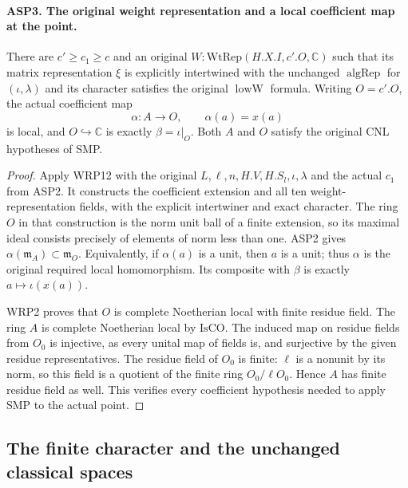 \documentclass[11pt,a4paper]{article}
\numberwithin{equation}{section}
\theoremstyle{remark}\newtheorem{remark}[theorem]{Remark}
\begin{document}
\paragraph{ASP3. The original weight representation and a local coefficient map at the point.}
\label{claim:ASP3}
There are $c'\geq c_1\geq c$ and an original
$W:\mathrm{WtRep}(H.X.I,\allowbreak{} c'.O,\mathbb C)$ such that
its matrix representation $\xi$ is explicitly
intertwined with the unchanged $\operatorname{algRep}$
for $(\iota,\lambda)$ and its character satisfies
the original $\operatorname{lowW}$ formula.
Writing $O=c'.O$, the actual coefficient map
\[
                \alpha:A\longrightarrow O,
                        \qquad\alpha(a)=x(a)
\]
is local, and $O\hookrightarrow\mathbb C$ is exactly
$\beta=\iota|_O$.  Both $A$ and $O$ satisfy
the original CNL hypotheses of SMP.
\begin{proof}
Apply WRP12 with the original
$L,\ell,\allowbreak{} n,\allowbreak{} H.V,\allowbreak{} H.S_l,\iota,\lambda$ and the actual
$c_1$ from ASP2.  It constructs the coefficient
extension and all ten weight-representation fields,
with the explicit intertwiner and exact character.
The ring $O$ in that construction is the norm unit
ball of a finite extension, so its maximal ideal
consists precisely of elements of norm less than
one.  ASP2 gives
$\alpha(\mathfrak m_A)\subset\mathfrak m_O$.
Equivalently, if $\alpha(a)$ is a unit, then $a$
is a unit; thus $\alpha$ is the original required
local homomorphism.  Its composite with $\beta$
is exactly $a\mapsto\iota(x(a))$.

WRP2 proves that $O$ is complete Noetherian local
with finite residue field.  The ring $A$ is complete
Noetherian local by $\mathrm{IsCO}$.  The induced
map on residue fields from $O_0$ is injective,
as every unital map of fields is, and surjective
by the given residue representatives.  The
residue field of $O_0$ is finite: $\ell$ is a
nonunit by its norm, so this field is a quotient
of the finite ring $O_0/\ell O_0$.
Hence $A$ has finite residue field as well.
This verifies every coefficient hypothesis
needed to apply SMP to the actual point.
\end{proof}

\subsection{The finite character and the unchanged classical spaces}

\end{document}
